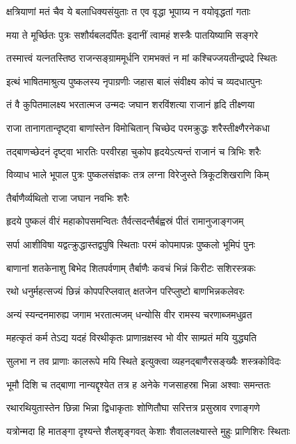 \twolineshloka
{क्षत्रियाणां मतं चैव ये बलाधिक्यसंयुताः}
{त एव वृद्धा भूपाग्र्य न वयोवृद्धतां गताः}%

\twolineshloka
{मया ते मूर्च्छितः पुत्रः सशौर्यबलदर्पितः}
{इदानीं त्वामहं शस्त्रैः पातयिष्यामि सङ्गरे}%

\twolineshloka
{तस्मात्त्वं यत्नतस्तिष्ठ राजन्सङ्ग्राममूर्धनि}
{रामभक्तं न मां कश्चिज्जयतीन्द्रपदे स्थितः}%

\twolineshloka
{इत्थं भाषितमाश्रुत्य पुष्कलस्य नृपाग्रणीः}
{जहास बालं संवीक्ष्य कोपं च व्यदधात्पुनः}%

\twolineshloka
{तं वै कुपितमालक्ष्य भरतात्मज उन्मदः}
{जघान शरविंशत्या राजानं हृदि तीक्ष्णया}%

\twolineshloka
{राजा तानागतान्दृष्ट्वा बाणांस्तेन विमोचितान्}
{चिच्छेद परमक्रुद्धः शरैस्तीक्ष्णैरनेकधा}%

\twolineshloka
{तद्बाणच्छेदनं दृष्ट्वा भारतिः परवीरहा}
{चुकोप हृदयेऽत्यन्तं राजानं च त्रिभिः शरैः}%

\twolineshloka
{विव्याध भाले भूपाल पुत्रः पुष्कलसंज्ञकः}
{तत्र लग्ना विरेजुस्ते त्रिकूटशिखराणि किम्}%

तैर्बाणैर्व्यथितो राजा जघान नवभिः शरैः

\twolineshloka
{हृदये पुष्कलं वीरं महाकोपसमन्वितः}
{तैर्वत्सदन्तैर्बह्वस्रं पीतं रामानुजाङ्गजम्}%

\twolineshloka
{सर्पा आशीविषा यद्वत्क्रुद्धास्तद्वपुषि स्थिताः}
{परमं कोपमापन्नः पुष्कलो भूमिपं पुनः}%

\twolineshloka
{बाणानां शतकेनाशु बिभेद शितपर्वणाम्}
{तैर्बाणैः कवचं भिन्नं किरीटः सशिरस्त्रकः}%

\twolineshloka
{रथो धनुर्महत्सज्यं छिन्नं कोपपरिप्लवात्}
{क्षतजेन परिप्लुष्टो बाणभिन्नकलेवरः}%

\twolineshloka
{अन्यं स्यन्दनमारुह्य जगाम भरतात्मजम्}
{धन्योसि वीर रामस्य चरणाब्जमधुव्रत}%

\twolineshloka
{महत्कृतं कर्म तेऽद्य यदहं विरथीकृतः}
{प्राणान्रक्षस्व भो वीर साम्प्रतं मयि युद्ध्यति}%

\twolineshloka
{सुलभा न तव प्राणाः कालरूपे मयि स्थिते}
{इत्युक्त्वा व्यहनद्बाणैरसङ्ख्यैः शस्त्रकोविदः}%

\twolineshloka
{भूमौ दिशि च तद्बाणा नान्यद्दृश्येत तत्र ह}
{अनेके गजसाहस्रा भिन्ना अश्वाः समन्ततः}%

\twolineshloka
{रथारथियुतास्तेन छिन्ना भिन्ना द्विधाकृताः}
{शोणितौघा सरित्तत्र प्रसुस्राव रणाङ्गणे}%

\twolineshloka
{यत्रोन्मदा हि मातङ्गा दृश्यन्ते शैलशृङ्गवत्}
{केशाः शैवाललक्ष्यास्ते मुहुः प्राणिशिरः स्थिताः}%

